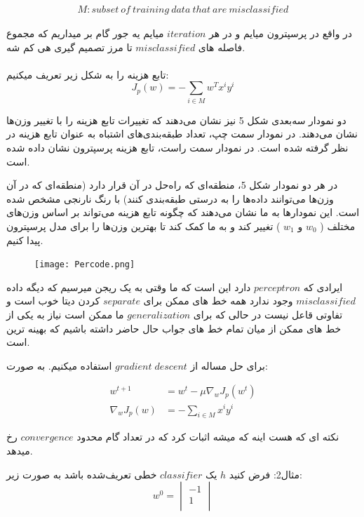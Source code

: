 \documentclass[12pt]{article}
\begin{document}
\begin{align*}
M: subset\:of\:training\:data\:that\:are\:misclassified
\end{align*}

در واقع در پرسپترون میایم و در هر $iteration$ میایم یه جور گام بر میداریم که مجموع فاصله های $misclassified $ تا مرز تصمیم گیری هی کم شه.
\\
\\

تابع هزینه را به شکل زیر تعریف میکنیم:
\[
J_p(w) = - \sum_{i \in M} w^T x^iy^i
\]

دو نمودار سه‌بعدی شکل 5 نیز نشان می‌دهند که تغییرات تابع هزینه را با تغییر وزن‌ها نشان می‌دهند. در نمودار سمت چپ، تعداد طبقه‌بندی‌های اشتباه به عنوان تابع هزینه در نظر گرفته شده است. در نمودار سمت راست، تابع هزینه پرسپترون نشان داده شده است.

در هر دو نمودار شکل 5، منطقه‌ای که راه‌حل در آن قرار دارد (منطقه‌ای که در آن وزن‌ها می‌توانند داده‌ها را به درستی طبقه‌بندی کنند) با رنگ نارنجی مشخص شده است. این نمودارها به ما نشان می‌دهند که چگونه تابع هزینه می‌تواند بر اساس وزن‌های مختلف ( \( w_0 \) و \( w_1 \) ) تغییر کند و به ما کمک کند تا بهترین وزن‌ها را برای مدل پرسپترون پیدا کنیم.

\begin{figure}[h]
    \centering
    \texttt{[image: Percode.png]}
    \label{fig:}
\end{figure}

ایرادی که $perceptron$ دارد این است که ما وقتی به یک ریجن میرسیم که دیگه داده $misclassified$ وجود ندارد همه خط های ممکن برای $separate$ کردن دیتا خوب است و تفاوتی قاعل نیست در حالی که برای $generalization$  ما ممکن است نیاز به یکی از خط های ممکن از میان تمام خط های جواب حال حاضر داشته باشیم که بهینه ترین است.

برای حل مساله از $gradient\; descent$ استفاده میکنیم. به صورت:  

\begin{align*}
w^{t+1} &= w^t - \mu \nabla_w J_p(w^t) \\
\nabla_w J_p(w) &= - \sum_{i \in M} x^i y^i
\end{align*}

نکته ای که هست اینه که میشه اثبات کرد که در تعداد گام محدود $convergence$  رخ میدهد.

مثال2: فرض کنید $h$ یک $classifier$ خطی تعریف‌شده باشد به صورت زیر:
\[
w^0=\begin{vmatrix}
-1 \\
1 \\
\end{vmatrix}
\]
\end{document}
